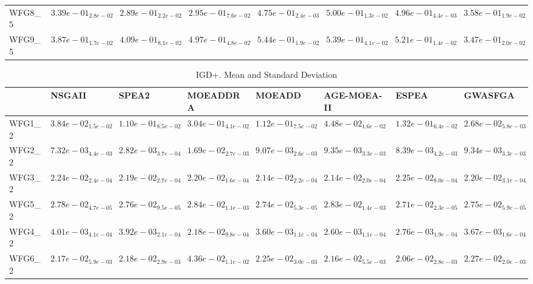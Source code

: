 \documentclass{article}
\begin{document}
\begin{landscape}
\begin{table}
\begin{scriptsize}
\begin{tabular}{llllllll}
WFG8\_5 & $  3.39e-01_{ 2.8e-02}$ & $  2.89e-01_{ 2.2e-02}$ & $  2.95e-01_{ 7.6e-02}$ & $  4.75e-01_{ 2.4e-03}$ & \cellcolor{gray95}$  5.00e-01_{ 1.3e-02}$ & \cellcolor{gray25}$  4.96e-01_{ 4.4e-03}$ & $  3.58e-01_{ 1.9e-02}$ \\
WFG9\_5 & $  3.87e-01_{ 1.7e-02}$ & $  4.09e-01_{ 8.1e-02}$ & $  4.97e-01_{ 4.8e-02}$ & \cellcolor{gray95}$  5.44e-01_{ 1.9e-02}$ & \cellcolor{gray25}$  5.39e-01_{ 4.1e-02}$ & $  5.21e-01_{ 1.4e-02}$ & $  3.47e-01_{ 2.0e-02}$ \\
\hline
\end{tabular}
\end{scriptsize}
\end{table}

\begin{table}
\caption{IGD+. Mean and Standard Deviation}
\label{table: IGD+}
\centering
\begin{scriptsize}
\begin{tabular}{llllllll}
\hline & NSGAII & SPEA2 & MOEADDRA & MOEADD & AGE-MOEA-II & ESPEA &  GWASFGA\\
\hline 
WFG1\_2 & \cellcolor{gray25}$  3.84e-02_{ 1.5e-02}$ & $  1.10e-01_{ 8.5e-02}$ & $  3.04e-01_{ 4.1e-02}$ & $  1.12e-01_{ 7.5e-02}$ & $  4.48e-02_{ 1.6e-02}$ & $  1.32e-01_{ 6.4e-02}$ & \cellcolor{gray95}$  2.68e-02_{ 5.8e-03}$ \\
WFG2\_2 & \cellcolor{gray25}$  7.32e-03_{ 4.4e-03}$ & \cellcolor{gray95}$  2.82e-03_{ 3.7e-04}$ & $  1.69e-02_{ 2.7e-03}$ & $  9.07e-03_{ 2.6e-03}$ & $  9.35e-03_{ 3.3e-03}$ & $  8.39e-03_{ 4.2e-03}$ & $  9.34e-03_{ 3.3e-03}$ \\
WFG3\_2 & $  2.24e-02_{ 2.4e-04}$ & $  2.19e-02_{ 2.7e-04}$ & $  2.20e-02_{ 1.6e-04}$ & \cellcolor{gray25}$  2.14e-02_{ 2.2e-04}$ & \cellcolor{gray95}$  2.14e-02_{ 2.0e-04}$ & $  2.25e-02_{ 8.0e-04}$ & $  2.20e-02_{ 3.1e-04}$ \\
WFG5\_2 & $  2.78e-02_{ 4.7e-05}$ & $  2.76e-02_{ 9.5e-05}$ & $  2.84e-02_{ 1.1e-03}$ & \cellcolor{gray25}$  2.74e-02_{ 5.3e-05}$ & $  2.83e-02_{ 1.4e-03}$ & \cellcolor{gray95}$  2.71e-02_{ 2.3e-05}$ & $  2.75e-02_{ 5.9e-05}$ \\
WFG4\_2 & $  4.01e-03_{ 4.1e-04}$ & $  3.92e-03_{ 2.1e-04}$ & $  2.18e-02_{ 9.8e-04}$ & $  3.60e-03_{ 1.1e-04}$ & \cellcolor{gray95}$  2.60e-03_{ 1.1e-04}$ & \cellcolor{gray25}$  2.76e-03_{ 1.9e-04}$ & $  3.67e-03_{ 1.6e-04}$ \\
WFG6\_2 & $  2.17e-02_{ 5.9e-03}$ & $  2.18e-02_{ 2.9e-03}$ & $  4.36e-02_{ 1.1e-02}$ & $  2.25e-02_{ 3.0e-03}$ & \cellcolor{gray25}$  2.16e-02_{ 5.5e-03}$ & \cellcolor{gray95}$  2.06e-02_{ 2.8e-03}$ & $  2.27e-02_{ 2.0e-03}$ \\

\end{tabular}
\end{scriptsize}
\end{table}
\end{landscape}
\end{document}
